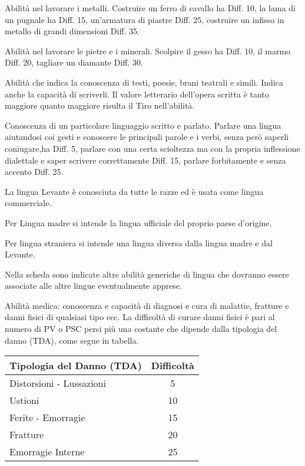  Abilit\`a nel lavorare i metalli.
Costruire un ferro di cavallo ha Diff. 10, la lama di un pugnale ha
Diff.  15, un'armatura di piastre Diff.  25, costruire un infisso in
metallo di grandi dimensioni Diff. 35.

  Abilit\`a nel lavorare le pietre e i minerali. Scolpire il
gesso ha Diff. 10, il marmo Diff. 20, tagliare un diamante Diff.  30.


  Abilit\`a che indica la conoscenza di
testi, poesie, brani teatrali e simili. Indica anche la capacit\`a
di scriverli.  Il valore letterario dell'opera scritta \`e tanto
maggiore quanto maggiore risulta il Tiro nell'abilit\`a.
\fi

 Conoscenza di un
particolare linguaggio scritto e parlato. Parlare una lingua
aiutandosi coi gesti e conoscere le principali parole e i verbi, senza
per\`o saperli coniugare,ha Diff.  5, parlare con una certa scioltezza
ma con la propria inflessione dialettale e saper scrivere
correttamente Diff.  15, parlare forbitamente e senza accento Diff.
25.

La lingua Levante \`e conosciuta da tutte le razze ed \`e usata come
lingua commerciale.

Per Lingua madre si intende la lingua ufficiale del proprio paese
d'origine.

Per lingua straniera si intende una lingua diversa dalla lingua madre
e dal Levante. 

Nella scheda sono indicate altre abilit\`a generiche di lingua che
dovranno essere associate alle altre lingue eventualmente apprese.

 Abilit\`a medica: conoscenza
e capacit\`a di diagnosi e cura di malattie, fratture e danni fisici
di qualsiasi tipo ecc. La difficolt\`a di curare danni fisici \`e
pari al numero di PV o PSC persi pi\`u una costante che dipende
dalla tipologia del danno (TDA), come segue in tabella.

\bigskip
\noindent
\begin{center}
\begin{tabular}{|l|c|}
\hline
  Tipologia del Danno (TDA)& Difficolt\`a \\ \hline\hline
  Distorsioni - Lussazioni & 5 \\ \hline
  Ustioni& 10 \\ \hline
  Ferite - Emorragie& 15 \\ \hline
  Fratture& 20 \\ \hline
  Emorragie Interne& 25 \\ \hline
\end{tabular}
\end{center}
\bigskip

